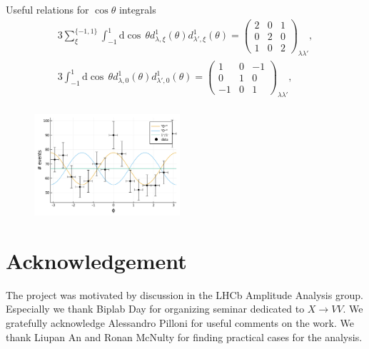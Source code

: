 \documentclass[prd,preprintnumbers,floatfix,
nofootinbib,superscriptaddress]{revtex4}
\newcommand{\diff}{\mathrm{d}}
\begin{document}
Useful relations for $\cos\theta$ integrals
\begin{align}
  3 \sum_{\xi}^{\{-1,1\}} \int_{-1}^{1} \diff \cos\,\theta d_{\lambda,\xi}^{1}(\theta) d_{\lambda',\xi}^{1}(\theta) =
  \begin{pmatrix}2 & 0 & 1\\0 & 2 & 0\\1 & 0 & 2\end{pmatrix}_{\lambda\lambda'},\\
  3 \int_{-1}^{1} \diff \cos\,\theta d_{\lambda,0}^{1}(\theta) d_{\lambda',0}^{1}(\theta) =
  \begin{pmatrix}1 & 0 & -1\\0 & 1 & 0\\-1 & 0 & 1\end{pmatrix}_{\lambda\lambda'},\\
\end{align}

\begin{figure}
  \includegraphics[width=0.48\textwidth]{../plots/phi_higgs.pdf}
  \caption{}
  \label{}
\end{figure}

\section*{Acknowledgement}
The project was motivated by discussion in the LHCb Amplitude Analysis group.
Especially we thank Biplab Day for organizing seminar dedicated to $X\to VV$.
We gratefully acknowledge Alessandro Pilloni for useful comments on the work.
We thank Liupan An and Ronan McNulty for finding practical cases for the analysis.
\end{document}
